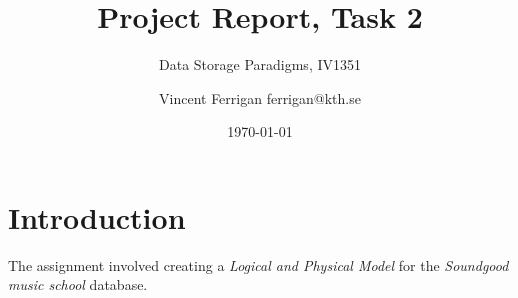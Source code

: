 \documentclass[a4paper]{scrartcl}
\title{Project Report, Task 2}
\subtitle{Data Storage Paradigms, IV1351}
\author{Vincent Ferrigan ferrigan@kth.se}
\date{\today}
\begin{document}
\maketitle
    







\section{Introduction}
The assignment involved creating a 
\emph{Logical and Physical Model} 
for the 
\emph{Soundgood music school} 
database. 

\end{document}
